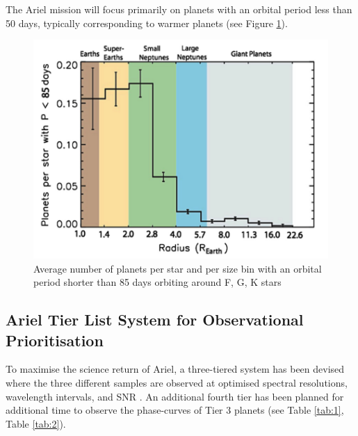 \documentclass[12pt]{article}
\begin{document}
The Ariel mission will focus primarily on planets with an orbital period less than 50 days, typically corresponding to warmer planets (see Figure \ref{fig:9}). 

\begin{figure}[H]
    \centering
    \includegraphics[width=.75\textwidth]{planet w small orbits.png}
    \caption{Average number of planets per star and per size bin with an orbital period shorter than 85 days orbiting around F, G, K stars \protect\cite{zingales2018ariel}}
    \label{fig:9}
\end{figure}

\subsection{Ariel Tier List System for Observational Prioritisation} \label{sec:3.3}

To maximise the science return of Ariel, a three-tiered system has been devised where the three different samples are observed at optimised spectral resolutions, wavelength intervals,
and SNR \cite{salvignol2024ariel}. An additional fourth tier has been planned for additional time to observe the phase-curves of Tier 3 planets \cite{arielstudyreport} (see Table \ref{tab:1}, Table \ref{tab:2}).
\end{document}
